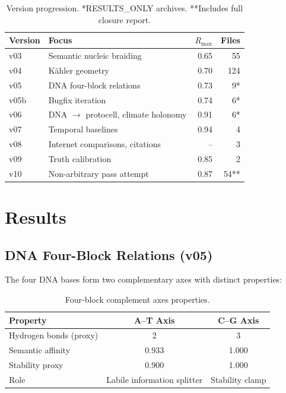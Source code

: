 \documentclass[11pt,a4paper]{article}
\begin{document}
\begin{table}[h]
\centering
\begin{tabular}{llrr}
\toprule
Version & Focus & $R_{\max}$ & Files \\
\midrule
v03 & Semantic nucleic braiding & 0.65 & 55 \\
v04 & K\"ahler geometry & 0.70 & 124 \\
v05 & DNA four-block relations & 0.73 & 9* \\
v05b & Bugfix iteration & 0.74 & 6* \\
v06 & DNA $\to$ protocell, climate holonomy & 0.91 & 6* \\
v07 & Temporal baselines & 0.94 & 4 \\
v08 & Internet comparisons, citations & -- & 3 \\
v09 & Truth calibration & 0.85 & 2 \\
v10 & Non-arbitrary pass attempt & 0.87 & 54** \\
\bottomrule
\end{tabular}
\caption{Version progression. *RESULTS\_ONLY archives. **Includes full closure report.}
\label{tab:versions}
\end{table}

\section{Results}

\subsection{DNA Four-Block Relations (v05)}

The four DNA bases form two complementary axes with distinct properties:

\begin{table}[h]
\centering
\begin{tabular}{lcc}
\toprule
Property & A--T Axis & C--G Axis \\
\midrule
Hydrogen bonds (proxy) & 2 & 3 \\
Semantic affinity & 0.933 & 1.000 \\
Stability proxy & 0.900 & 1.000 \\
Role & Labile information splitter & Stability clamp \\
\bottomrule
\end{tabular}
\caption{Four-block complement axes properties.}
\label{tab:four_block}
\end{table}
\end{document}
